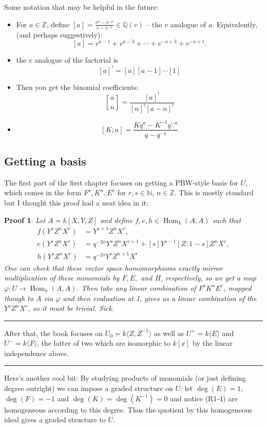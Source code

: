 \documentclass[12pt]{article}
\theoremstyle{nonumberbreak}
\theoremstyle{changebreak}
\theoremstyle{nonumberplain}
\newtheorem{prf}{Proof}
\theoremstyle{change}
\newcommand*{\bbZ}{\mathbb{Z}}
\newcommand*{\bbN}{\mathbb{N}}
\newcommand*{\bbQ}{\mathbb{Q}}
\DeclareMathOperator{\Hom}{Hom}
\newcommand*{\brk}{
\rule{2in}{.1pt}
}
\newcommand{\qbinom}{\genfrac{[}{]}{0pt}{}}
\begin{document}
Some notation that may be helpful in the future:
\begin{itemize}
	\item For $a\in\bbZ$, define $[a]=\frac{v^a-v^{-a}}{v-v^{-1}}\in\bbQ(v)$ -- the $v$ analogue of $a$. Equivalently, (and perhaps suggestively):
	\[[a]=v^{a-1}+v^{a-3}+\cdots+v^{-a+3}+v^{-a+1}.\]
	\item the $v$ analogue of the factorial is
	\[[a]^!=[a][a-1]\cdots[1]\]
	\item Then you get the binomial coefficients:
	\[\qbinom{a}{n}=\frac{[a]^!}{[n]^![a-n]^!}\]
	\item \[[K;a]=\frac{Kq^a-K^{-1}q^{-a}}{q-q^{-1}}\]
\end{itemize}

\subsection{Getting a basis}
The first part of the first chapter focuses on getting a PBW-style basis for $U$, which comes in the form $F^s,K^n,E^r$ for $r,s\in\bbN$, $n\in\bbZ$.
This is mostly standard but I thought this proof had a neat idea in it:

\begin{prf}
	Let $A=k[X,Y,Z]$ and define $f,e,h\in \Hom_k(A,A)$ such that 
	\begin{align*}
		f(Y^sZ^nX^r)&=Y^{s+1}Z^nX^r,\\
		e(Y^sZ^nX^r)&=q^{-2n}Y^sZ^nX^{r+1}+[s]Y^{s-1}[Z;1-s]Z^n X^r,\\
		h(Y^sZ^nX^r)&=q^{-2s}Y^sZ^{n+1}X^r
	\end{align*}
	One can check that these vector space homomorphisms exactly mirror multiplication of these monomials
	by $F, E,$ and $H$, respectively, so we get a map $\varphi:U\to\Hom_k(A,A)$. Then take any linear combination of 
	$F^sK^nE^r$, mapped though to $A$ via $\varphi$ and then evaluation at 1, gives us a linear combination of the $Y^sZ^nX^r$,
	so it must be trivial. Sick.
\end{prf}

\brk

After that, the book focuses on $U_0=k\langle Z,Z^{-1}\rangle$ as well as $U^+=k\langle E\rangle$ and $U^-=k\langle F\rangle$,
the latter of two which are isomorphic to $k[x]$ by the linear independence above.

\brk

Here's another cool bit: By studying products of monomials (or just defining degree outright) we can impose a graded structure on $U$:
let $\deg(E)=1$, $\deg(F)=-1$ and $\deg(K)=\deg(K^{-1})=0$ and notice (R1-4) are homogeneous according to this degree.
Thus the quotient by this homogeneous ideal gives a graded structure to $U$.
\end{document}
